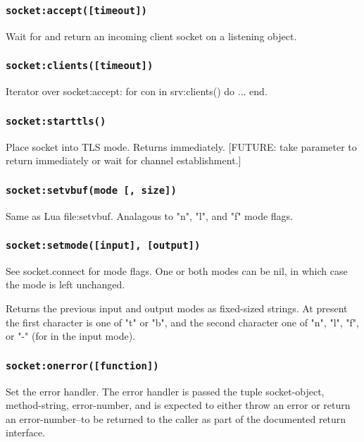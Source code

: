 \documentclass[11pt, oneside]{memoir}
\newcommand*{\fn}[1]{\texttt{#1}\xspace}
\begin{document}
\subsubsection[\fn{socket:accept}]{\fn{socket:accept([timeout])}}
	Wait for and return an incoming client socket on a listening object.

\subsubsection[\fn{socket:clients}]{\fn{socket:clients([timeout])}}
	Iterator over socket:accept: for con in srv:clients() do ... end.


\subsubsection[\fn{socket:starttls}]{\fn{socket:starttls()}}
	Place socket into TLS mode. Returns immediately. [FUTURE: take
	parameter to return immediately or wait for channel establishment.]

\subsubsection[\fn{socket:setvbuf}]{\fn{socket:setvbuf(mode [, size])}}
	Same as Lua file:setvbuf. Analagous to "n", "l", and "f" mode flags.

\subsubsection[\fn{socket:setmode}]{\fn{socket:setmode([input], [output])}}
	See socket.connect for mode flags. One or both modes can be nil,
	in which case the mode is left unchanged.

	Returns the previous input and output modes as fixed-sized strings.
	At present the first character is one of "t" or "b", and the second
	character one of "n", "l", "f", or "-" (for in the input mode).

\subsubsection[\fn{socket:onerror}]{\fn{socket:onerror([function])}}
	Set the error handler. The error handler is passed the tuple
	socket-object, method-string, error-number, and is expected to
	either throw an error or return an error-number--to be returned to
	the caller as part of the documented return interface.
\end{document}
